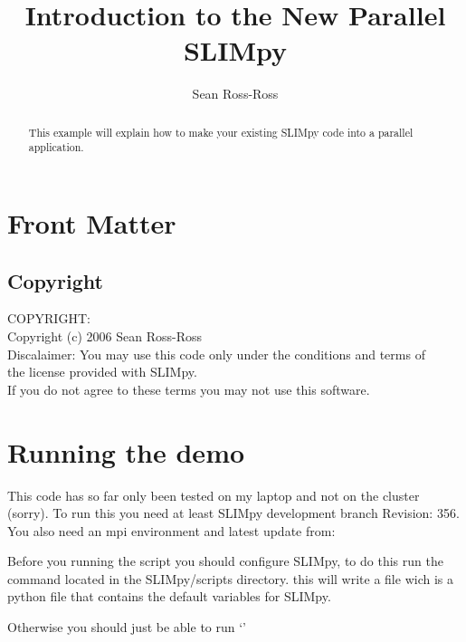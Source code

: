 \documentclass{manual}
\begin{document}
    
    \author{Sean Ross-Ross}
    \title{Introduction to the New Parallel SLIMpy}
   
    \maketitle
    
    \ifhtml
    \chapter*{Front Matter\label{front}}
    \fi
    
    \begin{abstract}
    This example will explain how to make your existing SLIMpy code into a parallel application. 
    \end{abstract}

    \section { Copyright }
    COPYRIGHT: \\
    Copyright (c) 2006 Sean Ross-Ross \\
    Discalaimer: You may use this code only under the conditions and terms of \\
    the license provided with SLIMpy. \\
    If you do not agree to these terms you may not use this software. 
    

    \tableofcontents
    
    \chapter{Running the demo}
    This code has so far only been tested on my laptop and not on the cluster (sorry).
    To run this you need at least SLIMpy development branch Revision: 356. You also need an  mpi environment
    and latest update from: 
    
    
    Before you  running the script you should configure SLIMpy, to do this run the command 
     located in the SLIMpy/scripts directory. this will write a file 
    wich is a python file that contains the default variables for SLIMpy.
   
    Otherwise you should just be able to run `'
    
\end{document}
